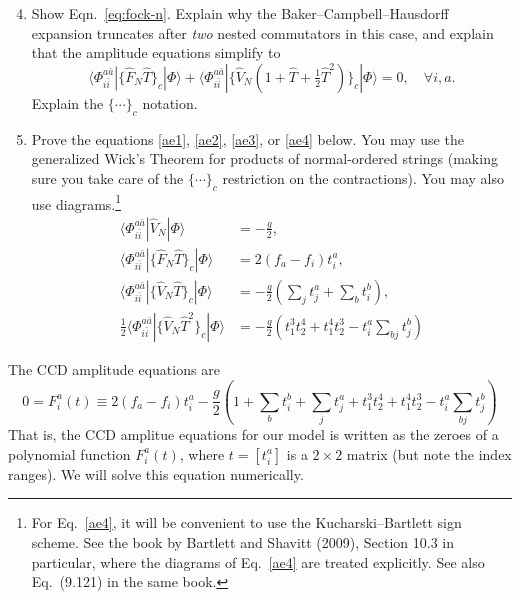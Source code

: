 \documentclass{report}
\newcommand{\braket}[1]{\langle#1\rangle}
\begin{document}
\begin{enumerate}[label=\emph{\alph*})]\setcounter{enumi}{3}
\item Show Eqn.~\eqref{eq:fock-n}.
  Explain why the Baker--Campbell--Hausdorff expansion truncates after \emph{two} nested commutators in this case, and explain that the amplitude equations simplify to
  \begin{equation*}
       \braket{\Phi_{i\bar{i}}^{a\bar{a}}|\{\hat{F}_N\hat{T}\}_c|\Phi} +  \braket{\Phi_{i\bar{i}}^{a\bar{a}}|\{\hat{V}_N (1 + \hat{T} + \tfrac{1}{2}\hat{T}^2) \}_c |\Phi } = 0, \quad \forall i,a.
  \end{equation*}
  Explain the $\{\cdots\}_c$ notation.
\item Prove the equations \eqref{ae1}, \eqref{ae2}, \eqref{ae3}, or
  \eqref{ae4} below. You may use the generalized Wick's Theorem for
  products of normal-ordered strings (making sure you take care of the
  $\{\cdots\}_c$ restriction on the contractions). You may also use
  diagrams.\footnote{For Eq.~\eqref{ae4}, it will be convenient to use the
  Kucharski--Bartlett sign scheme. See the book by Bartlett and Shavitt
  (2009), Section 10.3 in particular, where the diagrams of
  Eq.~\eqref{ae4} are treated explicitly. See also Eq.~(9.121) in the same book.}
  \begin{align}
    \braket{\Phi_{i\bar{i}}^{a\bar{a}}|\hat{V}_N|\Phi} &= - \frac{g}{2}, \label{ae1} \\
    \braket{\Phi_{i\bar{i}}^{a\bar{a}}|\{\hat{F}_N\hat{T}\}_c|\Phi} &= 2(f_a - f_i)t_i^a,   \label{ae2} \\
    \braket{\Phi_{i\bar{i}}^{a\bar{a}}|\{\hat{V}_N\hat{T}\}_c|\Phi} &= - \frac{g}{2}\left(\sum_j t_j^a + \sum_b t_i^b\right),\label{ae3} \\
    \frac{1}{2}\braket{\Phi_{i\bar{i}}^{a\bar{a}}|\{\hat{V}_N\hat{T}^2\}_c|\Phi} &= -\frac{g}{2}\left(t_1^3 t_2^4 + t_1^4 t_2^3 - t_i^a \sum_{bj} t_j^b \right)\label{ae4}
  \end{align}
\end{enumerate}

  The CCD amplitude equations are
  \begin{equation*}
  0 =    F_i^a(t) \equiv  2(f_a - f_i)t_i^a - \frac{g}{2}\left(1 + \sum_b t_i^b + \sum_j t_j^a + t_1^3 t_2^4 + t_1^4 t_2^3 - t_i^a \sum_{bj} t_j^b \right) 
  \end{equation*}
  That is, the CCD amplitue equations for our model is written as the zeroes of a polynomial function $F_i^a(t)$, where $t = [t_i^a]$ is a $2\times 2$ matrix (but note the index ranges). We will solve this equation numerically. 
\end{document}
